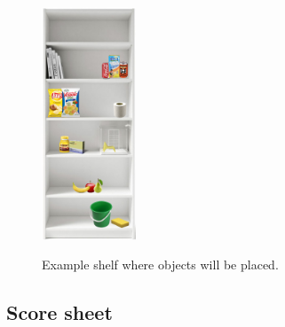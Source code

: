\begin{figure}
  \centering
  \includegraphics[width=0.25\textwidth]{images/storing_groceries.png}
  \vspace{-10pt}
  \label{fig:storing_groceries}
  \caption{Example shelf where objects will be placed.}
\end{figure}

\subsection{Score sheet}


